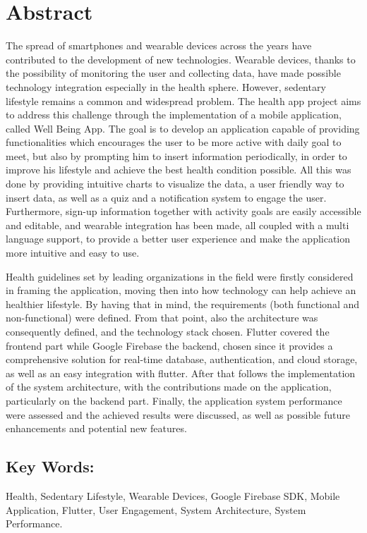 \section{Abstract}

The spread of smartphones and wearable devices across the years have contributed to the development of new technologies. Wearable devices, thanks to the possibility of monitoring the user and collecting data, have made possible technology integration especially in the health sphere. However, sedentary lifestyle remains a common and widespread problem. The health app project aims to address this challenge through the implementation of a mobile application, called Well Being App. The goal is to develop an application capable of providing functionalities which encourages the user to be more active with daily goal to meet, but also by prompting him to insert information periodically, in order to improve his lifestyle and achieve the best health condition possible. All this was done by providing intuitive charts to visualize the data, a user friendly way to insert data, as well as a quiz and a notification system to engage the user. Furthermore, sign-up information together with activity goals are easily accessible and editable, and wearable integration has been made, all coupled with a multi language support, to provide a better user experience and make the application more intuitive and easy to use.

\noindent Health guidelines set by leading organizations in the field were firstly considered in framing the application, moving then into how technology can help achieve an healthier lifestyle. By having that in mind, the requirements (both functional and non-functional) were defined. From that point, also the architecture was consequently defined, and the technology stack chosen. Flutter covered the frontend part while Google Firebase the backend, chosen since it provides a comprehensive solution for real-time database, authentication, and cloud storage, as well as an easy integration with flutter. After that follows the implementation of the system architecture, with the contributions made on the application, particularly on the backend part. Finally, the application system performance were assessed and the achieved results were discussed, as well as possible future enhancements and potential new features. 

\subsection{Key Words:}

Health, Sedentary Lifestyle, Wearable Devices, Google Firebase SDK, Mobile Application, Flutter, User Engagement, System Architecture, System Performance.
